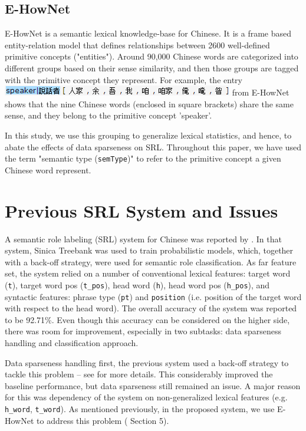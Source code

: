 \documentclass[11pt]{article}
\begin{document}
\subsection{E-HowNet}
E-HowNet \cite{Chen:2010:EAC:1944284.1944296} is a semantic lexical knowledge-base for Chinese. It is a frame based entity-relation model that defines relationships between 2600 well-defined primitive concepts ("entities"). Around 90,000 Chinese words are categorized into different groups based on their sense similarity, and then those groups are tagged with the primitive concept they represent. For example, the entry \includegraphics[width=.4\textwidth]{./examples/ehownet-snapshot.png} from E-HowNet shows that the nine Chinese words (enclosed in square brackets) share the same sense, and they belong to the primitive concept 'speaker'.

In this study, we use this grouping to generalize lexical statistics, and hence, to abate the effects of data sparseness on SRL. Throughout this paper, we have used the term "semantic type (\verb+semType+)" to refer to the primitive concept a given Chinese word represent. 
\section{Previous SRL System and Issues}
A semantic role labeling (SRL) system for Chinese was reported by \cite{you-chen:2004}. In that system, Sinica Treebank was used to train probabilistic models, which, together with a back-off strategy, were used for semantic role classification. As far feature set, the system relied on a number of conventional lexical features: target word (\verb+t+), target word pos (\verb+t_pos+), head word (\verb+h+), head word pos (\verb+h_pos+), and syntactic features: phrase type (\verb+pt+) and \verb+position+ (i.e. position of the target word with respect to the head word). The overall accuracy of the system was reported to be 92.71\%. Even though this accuracy can be considered on the higher side, there was room for improvement, especially in two subtasks: data sparseness handling and classification approach.

Data sparseness handling first, the previous system used a back-off strategy to tackle this problem -- see \cite{you-chen:2004} for more details. This considerably improved the baseline performance, but data sparseness still remained an issue. A major reason for this was dependency of the system on non-generalized lexical features (e.g. \verb+h_word+, \verb+t_word+). As mentioned previously, in the proposed system, we use E-HowNet to address this problem ( Section 5).
\end{document}
